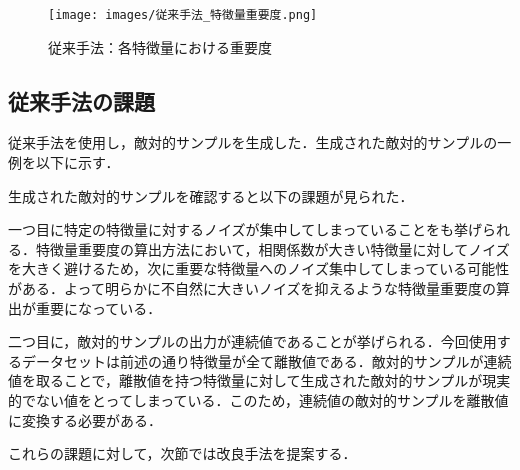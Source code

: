 \begin{figure}[H]
    \centering
    \texttt{[image: images/従来手法\_特徴量重要度.png]}
    \caption{従来手法：各特徴量における重要度}
    \label{fig:default_method_feature_importance}
\end{figure}


\subsection{従来手法の課題}
従来手法を使用し，敵対的サンプルを生成した．生成された敵対的サンプルの一例を以下に示す．


生成された敵対的サンプルを確認すると以下の課題が見られた．

一つ目に特定の特徴量に対するノイズが集中してしまっていることをも挙げられる．特徴量重要度の算出方法において，相関係数が大きい特徴量に対してノイズを大きく避けるため，次に重要な特徴量へのノイズ集中してしまっている可能性がある．よって明らかに不自然に大きいノイズを抑えるような特徴量重要度の算出が重要になっている．
    

二つ目に，敵対的サンプルの出力が連続値であることが挙げられる．今回使用するデータセットは前述の通り特徴量が全て離散値である．敵対的サンプルが連続値を取ることで，離散値を持つ特徴量に対して生成された敵対的サンプルが現実的でない値をとってしまっている．このため，連続値の敵対的サンプルを離散値に変換する必要がある．


これらの課題に対して，次節では改良手法を提案する．